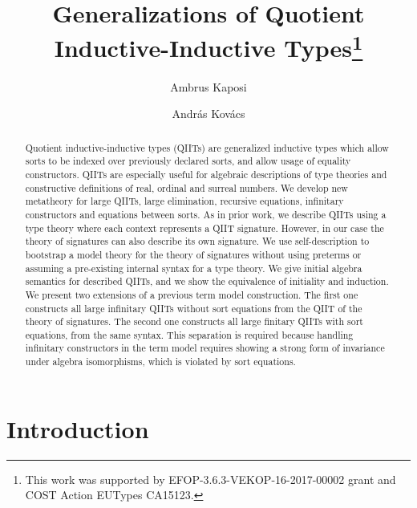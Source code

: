 \documentclass{llncs}
\begin{document}
\title{Generalizations of Quotient Inductive-Inductive Types\thanks{This work
    was supported by EFOP-3.6.3-VEKOP-16-2017-00002 grant and COST
    Action EUTypes CA15123.}}

\author{Ambrus Kaposi \and Andr{\'a}s Kov{\'a}cs}

\maketitle

\begin{abstract}
Quotient inductive-inductive types (QIITs) are generalized inductive types which
allow sorts to be indexed over previously declared sorts, and allow usage of
equality constructors. QIITs are especially useful for algebraic descriptions of
type theories and constructive definitions of real, ordinal and surreal
numbers. We develop new metatheory for large QIITs, large elimination, recursive
equations, infinitary constructors and equations between sorts.
As in prior work, we describe QIITs using a type theory where each context
represents a QIIT signature. However, in our case the theory of signatures can
also describe its own signature. We use self-description to bootstrap a model
theory for the theory of signatures without using preterms or assuming a
pre-existing internal syntax for a type theory. We give initial algebra
semantics for described QIITs, and we show the equivalence of initiality and
induction. We present two extensions of a previous term model construction. The
first one constructs all large infinitary QIITs without sort equations from the
QIIT of the theory of signatures. The second one constructs all large finitary
QIITs with sort equations, from the same syntax. This separation is required
because handling infinitary constructors in the term model requires showing a
strong form of invariance under algebra isomorphisms, which is violated by sort
equations.


\end{abstract}

\section{Introduction}
\label{sec:intro}
\end{document}
